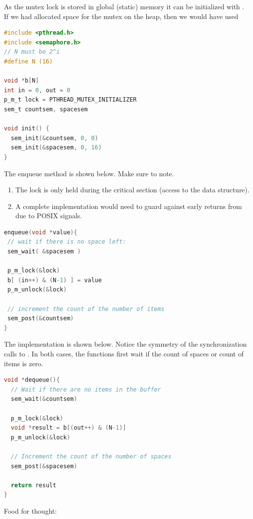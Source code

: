 As the mutex lock is stored in global (static) memory it can be initialized with .
If we had allocated space for the mutex on the heap, then we would have used 

\begin{lstlisting}[language=C]
#include <pthread.h>
#include <semaphore.h>
// N must be 2^i
#define N (16)

void *b[N]
int in = 0, out = 0
p_m_t lock = PTHREAD_MUTEX_INITIALIZER
sem_t countsem, spacesem

void init() {
  sem_init(&countsem, 0, 0)
  sem_init(&spacesem, 0, 16)
}
\end{lstlisting}

The enqueue method is shown below.
Make sure to note.

\begin{enumerate}
\item The lock is only held during the critical section (access to the data structure).
\item A complete implementation would need to guard against early returns from  due to POSIX signals.
\end{enumerate}

\begin{lstlisting}[language=C]
enqueue(void *value){
 // wait if there is no space left:
 sem_wait( &spacesem )

 p_m_lock(&lock)
 b[ (in++) & (N-1) ] = value
 p_m_unlock(&lock)

 // increment the count of the number of items
 sem_post(&countsem)
}
\end{lstlisting}

The  implementation is shown below.
Notice the symmetry of the synchronization calls to .
In both cases, the functions first wait if the count of spaces or count of items is zero.

\begin{lstlisting}[language=C]
void *dequeue(){
  // Wait if there are no items in the buffer
  sem_wait(&countsem)

  p_m_lock(&lock)
  void *result = b[(out++) & (N-1)]
  p_m_unlock(&lock)

  // Increment the count of the number of spaces
  sem_post(&spacesem)

  return result
}
\end{lstlisting}

Food for thought:

